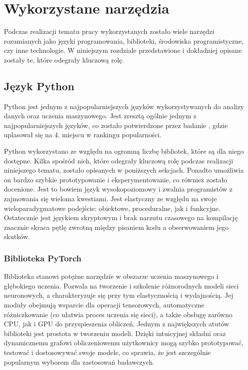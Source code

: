 \chapter{Wykorzystane narzędzia}
Podczas realizacji tematu pracy wykorzystanych zostało wiele narzędzi rozumianych jako języki programowania, biblioteki, środowiska programistyczne, czy inne technologie. W niniejszym rozdziale przedstawione i dokładniej opisane zostały te, które odegrały kluczową rolę.

\section{Język Python}
Python jest jednym z najpopularniejszych języków wykorzystywanych do analizy danych oraz uczenia maszynowego. Jest zresztą ogólnie jednym z najpopularniejszych języków, co zostało potwierdzone przez badanie  , gdzie uplasował się na 4. miejscu w rankingu popularności.

Python wykorzystano ze względu na ogromną liczbę bibliotek, które są dla niego dostępne. Kilka spośród nich, które odegrały kluczową rolę podczas realizacji niniejszego tematu, zostało opisanych w poniższych sekcjach. Ponadto umożliwia on bardzo szybkie prototypowanie i eksperymentowanie, co również zostało docenione. Jest to bowiem język wysokopoziomowy i zwalnia programistów z zajmowania się wieloma kwestiami. Jest elastyczny ze względu na swoje wieloparadygmatowe podejście: obiektowe, proceduralne, jak i funkcyjne. Ostatecznie jest językiem skryptowym i brak narzutu czasowego na kompilację znacznie skraca pętlę zwrotną między pisaniem kodu a obserwowaniem jego skutków.

\subsection{Biblioteka PyTorch}
Biblioteka  stanowi potężne narzędzie w obszarze uczenia maszynowego i głębokiego uczenia. Pozwala na tworzenie i szkolenie różnorodnych modeli sieci neuronowych, a charakteryzuje się przy tym elastycznością i wydajnością.  Jej moduły obejmują wsparcie dla operacji tensorowych, automatyczne różniczkowanie (co ułatwia proces uczenia się sieci), a także obsługę zarówno CPU, jak i GPU do przyspieszenia obliczeń. Jednym z największych atutów biblioteki  jest prostota w tworzeniu modeli. Dzięki intuicyjnej składni oraz dynamicznemu grafowi obliczeniowemu użytkownicy mogą szybko prototypować, testować i dostosowywać swoje modele, co sprawia, że jest szczególnie popularnym wyborem dla zastosowań badawczych.

